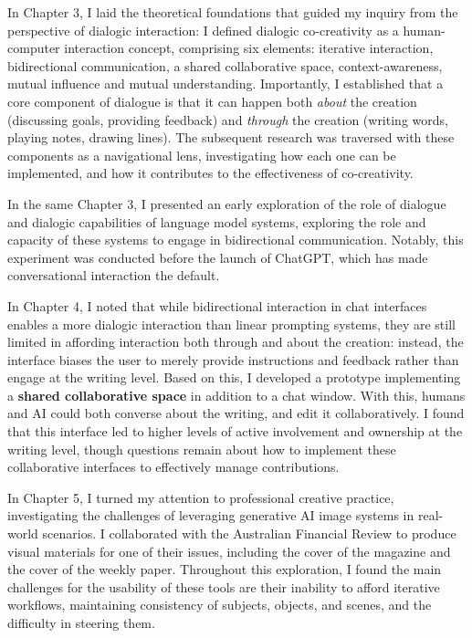 In Chapter 3, I laid the theoretical foundations that guided my inquiry from the perspective of dialogic interaction: I defined dialogic co-creativity as a human-computer interaction concept, comprising six elements: iterative interaction, bidirectional communication, a shared collaborative space, context-awareness, mutual influence and mutual understanding. Importantly, I established that a core component of dialogue is that it can happen both \textit{about} the creation (discussing goals, providing feedback) and \textit{through} the creation (writing words, playing notes, drawing lines). The subsequent research was traversed with these components as a navigational lens, investigating how each one can be implemented, and how it contributes to the effectiveness of co-creativity.

In the same Chapter 3, I presented an early exploration of the role of dialogue and dialogic capabilities of language model systems, exploring the role and capacity of these systems to engage in bidirectional communication. Notably, this experiment was conducted before the launch of ChatGPT, which has made conversational interaction the default.

In Chapter 4, I noted that while bidirectional interaction in chat interfaces enables a more dialogic interaction than linear prompting systems, they are still limited in affording interaction both through and about the creation: instead, the interface biases the user to merely provide instructions and feedback rather than engage at the writing level. Based on this, I developed a prototype implementing a \textbf{shared collaborative space} in addition to a chat window. With this, humans and AI could both converse about the writing, and edit it collaboratively. I found that this interface led to higher levels of active involvement and ownership at the writing level, though questions remain about how to implement these collaborative interfaces to effectively manage contributions.

In Chapter 5, I turned my attention to professional creative practice, investigating the challenges of leveraging generative AI image systems in real-world scenarios. I collaborated with the Australian Financial Review to produce visual materials for one of their issues, including the cover of the magazine and the cover of the weekly paper. Throughout this exploration, I found the main challenges for the usability of these tools are their inability to afford iterative workflows, maintaining consistency of subjects, objects, and scenes, and the difficulty in steering them.

